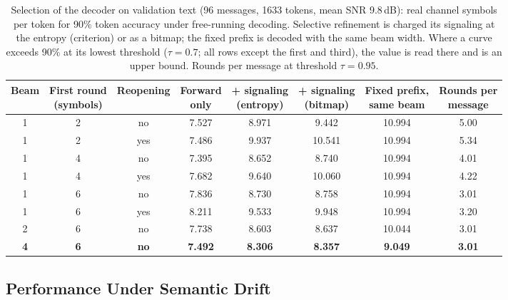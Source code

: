 \begin{table}[!tbp]
\centering
\caption{Selection of the decoder on validation text (96 messages, 1633 tokens, mean SNR 9.8\,dB): real channel symbols per token for 90\% token accuracy under free-running decoding. Selective refinement is charged its signaling at the entropy (criterion) or as a bitmap; the fixed prefix is decoded with the same beam width. Where a curve exceeds 90\% at its lowest threshold ($\tau = 0.7$; all rows except the first and third), the value is read there and is an upper bound. Rounds per message at threshold $\tau = 0.95$.}
\label{tab:decoder}
\small
\begin{tabular}{@{}cccccccc@{}}
\toprule
Beam & \makecell{First round\\(symbols)} & Reopening & \makecell{Forward\\only} & \makecell{+ signaling\\(entropy)} & \makecell{+ signaling\\(bitmap)} & \makecell{Fixed prefix,\\same beam} & \makecell{Rounds per\\message} \\
\midrule
1 & 2 & no  & 7.527 & 8.971 & 9.442  & 10.994 & 5.00 \\
1 & 2 & yes & 7.486 & 9.937 & 10.541 & 10.994 & 5.34 \\
1 & 4 & no  & 7.395 & 8.652 & 8.740  & 10.994 & 4.01 \\
1 & 4 & yes & 7.682 & 9.640 & 10.060 & 10.994 & 4.22 \\
1 & 6 & no  & 7.836 & 8.730 & 8.758  & 10.994 & 3.01 \\
1 & 6 & yes & 8.211 & 9.533 & 9.948  & 10.994 & 3.20 \\
2 & 6 & no  & 7.738 & 8.603 & 8.637  & 10.044 & 3.01 \\
\textbf{4} & \textbf{6} & \textbf{no} & \textbf{7.492} & \textbf{8.306} & \textbf{8.357} & \textbf{9.049} & \textbf{3.01} \\
\bottomrule
\end{tabular}
\end{table}

\subsection{Performance Under Semantic Drift}
\label{sec:results-drift}

